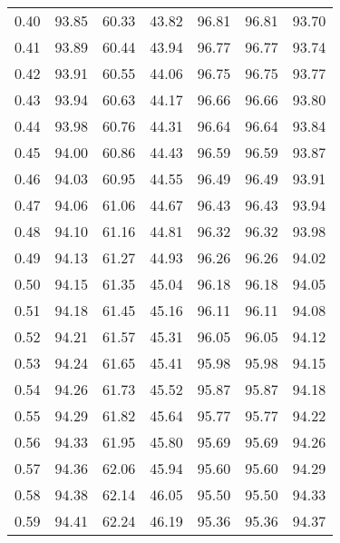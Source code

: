 \begin{tabular}{|c|c|c|c|c|c|c|}
      0.40 &     93.85 &     60.33 &      43.82 &   96.81 &      96.81 &         93.70 \\
      0.41 &     93.89 &     60.44 &      43.94 &   96.77 &      96.77 &         93.74 \\
      0.42 &     93.91 &     60.55 &      44.06 &   96.75 &      96.75 &         93.77 \\
      0.43 &     93.94 &     60.63 &      44.17 &   96.66 &      96.66 &         93.80 \\
      0.44 &     93.98 &     60.76 &      44.31 &   96.64 &      96.64 &         93.84 \\
      0.45 &     94.00 &     60.86 &      44.43 &   96.59 &      96.59 &         93.87 \\
      0.46 &     94.03 &     60.95 &      44.55 &   96.49 &      96.49 &         93.91 \\
      0.47 &     94.06 &     61.06 &      44.67 &   96.43 &      96.43 &         93.94 \\
      0.48 &     94.10 &     61.16 &      44.81 &   96.32 &      96.32 &         93.98 \\
      0.49 &     94.13 &     61.27 &      44.93 &   96.26 &      96.26 &         94.02 \\
      0.50 &     94.15 &     61.35 &      45.04 &   96.18 &      96.18 &         94.05 \\
      0.51 &     94.18 &     61.45 &      45.16 &   96.11 &      96.11 &         94.08 \\
      0.52 &     94.21 &     61.57 &      45.31 &   96.05 &      96.05 &         94.12 \\
      0.53 &     94.24 &     61.65 &      45.41 &   95.98 &      95.98 &         94.15 \\
      0.54 &     94.26 &     61.73 &      45.52 &   95.87 &      95.87 &         94.18 \\
      0.55 &     94.29 &     61.82 &      45.64 &   95.77 &      95.77 &         94.22 \\
      0.56 &     94.33 &     61.95 &      45.80 &   95.69 &      95.69 &         94.26 \\
      0.57 &     94.36 &     62.06 &      45.94 &   95.60 &      95.60 &         94.29 \\
      0.58 &     94.38 &     62.14 &      46.05 &   95.50 &      95.50 &         94.33 \\
      0.59 &     94.41 &     62.24 &      46.19 &   95.36 &      95.36 &         94.37 \\

\end{tabular}
